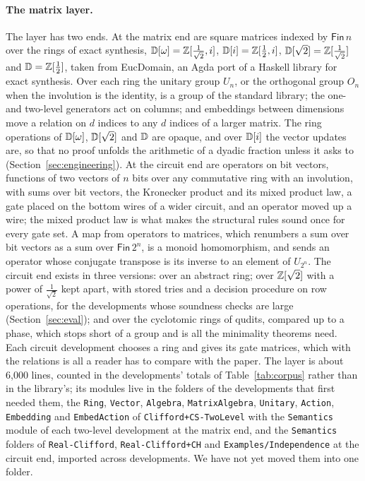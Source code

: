 \paragraph{The matrix layer.}\label{sec:matrix-layer} The layer has two
ends. At the matrix end are square matrices indexed by $\mathsf{Fin}\,n$
over the rings of exact synthesis, $\mathbb{D}[\omega]=\mathbb{Z}[\frac1{\sqrt2},i]$,
$\mathbb{D}[i]=\mathbb{Z}[\frac12,i]$, $\mathbb{D}[\sqrt2]=\mathbb{Z}[\frac1{\sqrt2}]$ and
$\mathbb{D}=\mathbb{Z}[\frac12]$, taken from EucDomain, an Agda port of a Haskell
library for exact synthesis. Over each ring the unitary group $U_n$, or
the orthogonal group $O_n$ when the involution is the identity, is a
group of the standard library; the one- and two-level generators act on
columns; and embeddings between dimensions move a relation on $d$
indices to any $d$ indices of a larger matrix. The ring operations of
$\mathbb{D}[\omega]$, $\mathbb{D}[\sqrt2]$ and $\mathbb{D}$ are opaque, and over $\mathbb{D}[i]$ the
vector updates are, so that no proof unfolds the arithmetic of a
dyadic fraction unless it asks to (Section~\ref{sec:engineering}). At
the circuit end are operators on bit vectors, functions of two vectors
of $n$ bits over any commutative ring with an involution, with sums
over bit vectors, the Kronecker product and its mixed product law, a
gate placed on the bottom wires of a wider circuit, and an operator
moved up a wire; the mixed product law is what makes the structural
rules sound once for every gate set. A map from operators to matrices,
which renumbers a sum over bit vectors as a sum over
$\mathsf{Fin}\,2^n$, is a monoid homomorphism, and sends an operator
whose conjugate transpose is its inverse to an element of $U_{2^n}$.
The circuit end exists in three versions: over an abstract ring; over
$\mathbb{Z}[\sqrt2]$ with a power of $\frac1{\sqrt2}$ kept apart, with stored
tries and a decision procedure on row operations, for the developments
whose soundness checks are large (Section~\ref{sec:eval}); and over the
cyclotomic rings of qudits, compared up to a phase, which stops short
of a group and is all the minimality theorems need. Each circuit
development chooses a ring and gives its gate matrices, which with the
relations is all a reader has to compare with the paper. The layer is
about 6{,}000 lines, counted in the developments' totals of
Table~\ref{tab:corpus} rather than in the library's; its modules live
in the folders of the developments that first needed them, the
\texttt{Ring}, \texttt{Vector}, \texttt{Algebra},
\texttt{MatrixAlgebra}, \texttt{Unitary}, \texttt{Action},
\texttt{Embedding} and \texttt{EmbedAction} of
\texttt{Clifford+CS-TwoLevel} with the \texttt{Semantics} module of
each two-level development at the matrix end, and the
\texttt{Semantics} folders of \texttt{Real-Clifford},
\texttt{Real-Clifford+CH} and \texttt{Examples/Independence} at the
circuit end, imported across developments. We have not yet moved them
into one folder.

